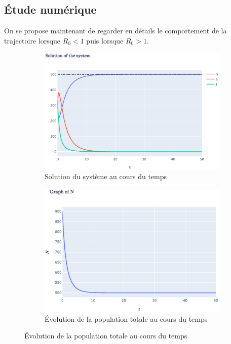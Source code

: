 \documentclass[11pt]{article}
\begin{document}
\subsection{\'Etude num\'erique}
On se propose maintenant de regarder en d\'etails le comportement de la trajectoire lorsque $R_0 < 1$ puis lorsque $R_0 > 1$. 
\begin{figure}[hb]
	\begin{subfigure}{0.49\textwidth}
	  \centering
	  \includegraphics[width=\linewidth]{../figures/numerical_study_R0_lt1_1.eps}  
	  \caption{Solution du syst\`eme au cours du temps}
	  \label{fig:numerical study r0 lt 1 a}
	\end{subfigure}
	\begin{subfigure}{0.49\textwidth}
	  \centering
	  \includegraphics[width=\linewidth]{../figures/numerical_study_R0_lt1_2.eps}  
	  \caption{\'Evolution de la population totale au cours du temps}

\end{subfigure}
\end{figure}
\end{document}
